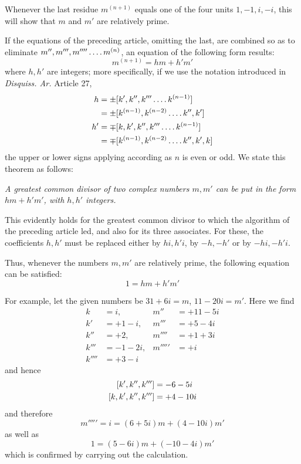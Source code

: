 Whenever the last residue $m^{(n+1)}$ equals one of the four units $1,-1,i,-i$, this will show that $m$ and $m'$ are relatively prime.

If the equations of the preceding article, omitting the last, are combined so as to eliminate $m'',\allowbreak m''',\allowbreak m''''\mathinner{.\,.\,.\,.}\allowbreak m^{(n)}$, an equation of the following form results:
\[
m^{(n+1)}=hm+h'm'
\]
%
where $h,h'$ are integers; more specifically, if we use the notation introduced in \emph{Disquiss. Ar.} Article 27,
\[
\begin{aligned}
h&=\pm[k',k'',k'''\mathinner{.\,.\,.\,.} k^{(n-1)}]\\
&=\pm[k^{(n-1)},k^{(n-2)}\mathinner{.\,.\,.\,.} k'',k']\\
h'&=\mp[k,k',k'',k'''\mathinner{.\,.\,.\,.} k^{(n-1)}]\\
&=\mp[k^{(n-1)},k^{(n-2)}\mathinner{.\,.\,.\,.} k'',k',k]
\end{aligned}
\]
the upper or lower signs applying according as $n$ is even or odd. We state this theorem as follows:

\emph{A greatest common divisor of two complex numbers $m,m'$ can be put in the form $hm+h'm'$, with $h,h'$ integers.}

This evidently holds for the greatest common divisor to which the algorithm of the preceding article led, and also for its three associates. For these, the coefficients $h,h'$ must be replaced either by $hi,h'i$, by $-h,-h'$ or by $-hi,-h'i$.

Thus, whenever the numbers $m,m'$ are relatively prime, the following equation can be satisfied:
\[
1=hm+h'm'
\]

For example, let the given numbers be $31+6i=m$, $11-20i=m'$. Here we find
\[
\begin{aligned}
k&=i,&m''&=+11-5i\\
k'&=+1-i,&m'''&=+5-4i\\
k''&=+2,&m''''&=+1+3i\\
k'''&=-1-2i,&m'''''&=+i\\
k''''&=+3-i
\end{aligned}
\]
and hence
\[
\begin{aligned}
\relax[k',k'',k''']&=-6-5i\\
[k,k',k'',k''']&=+4-10i
\end{aligned}
\]
and therefore
\[
m'''''=i=(6+5i)m+(4-10i)m'
\]
as well as
\[
1=(5-6i)m+(-10-4i)m'
\]
which is confirmed by carrying out the calculation.

